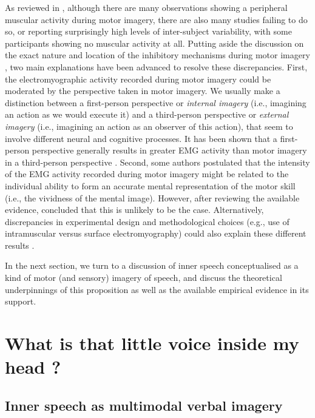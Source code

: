 \documentclass[a4paper,11pt,oneside,oldfontcommands]{memoir}
\begin{document}
As reviewed in \citet{guillot_electromyographic_2010}, although there
are many observations showing a peripheral muscular activity during
motor imagery, there are also many studies failing to do so, or
reporting surprisingly high levels of inter-subject variability, with
some participants showing no muscular activity at all. Putting aside the
discussion on the exact nature and location of the inhibitory mechanisms
during motor imagery \citep[see][]{guillot_imagining_2012}, two main
explanations have been advanced to resolve these discrepancies. First,
the electromyographic activity recorded during motor imagery could be
moderated by the perspective taken in motor imagery. We usually make a
distinction between a first-person perspective or \emph{internal
imagery} (i.e., imagining an action as we would execute it) and a
third-person perspective or \emph{external imagery} (i.e., imagining an
action as an observer of this action), that seem to involve different
neural and cognitive processes. It has been shown that a first-person
perspective generally results in greater EMG activity than motor imagery
in a third-person perspective
\citep{hale_effects_1982, harris_effects_1986}. Second, some authors
postulated that the intensity of the EMG activity recorded during motor
imagery might be related to the individual ability to form an accurate
mental representation of the motor skill (i.e., the vividness of the
mental image). However, after reviewing the available evidence,
\citet{guillot_brain_2009} concluded that this is unlikely to be the
case. Alternatively, discrepancies in experimental design and
methodological choices (e.g., use of intramuscular versus surface
electromyography) could also explain these different results
\citep{guillot_electromyographic_2010}.

In the next section, we turn to a discussion of inner speech
conceptualised as a kind of motor (and sensory) imagery of speech, and
discuss the theoretical underpinnings of this proposition as well as the
available empirical evidence in its support.

\section{What is that little voice inside my head
?}\label{what-is-that-little-voice-inside-my-head}

\subsection{Inner speech as multimodal verbal
imagery}\label{inner-speech-as-multimodal-verbal-imagery}
\end{document}
